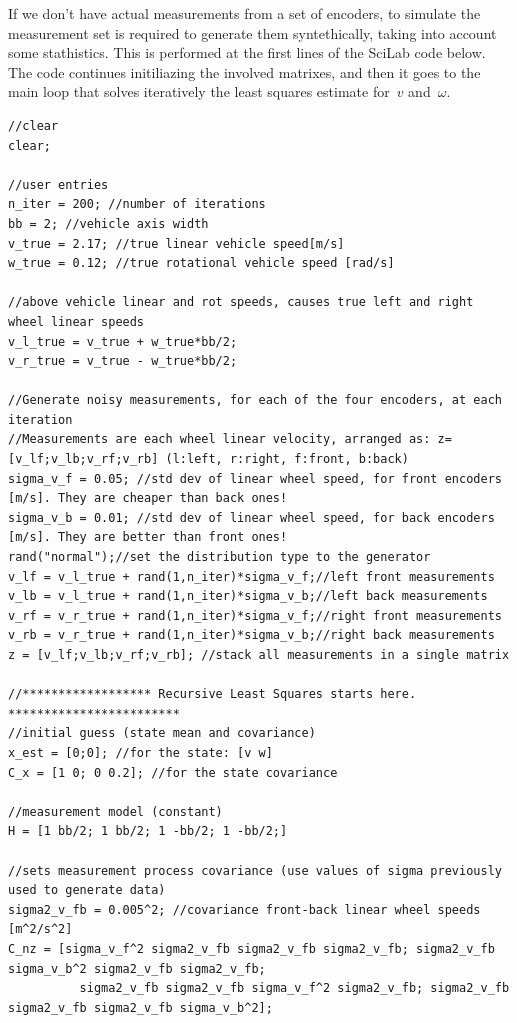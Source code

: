If we don't have actual measurements from a set of encoders, to simulate the measurement set is required to generate them syntethically, taking into account some stathistics. This is performed at the first lines of the SciLab code below.  The code continues initiliazing the involved matrixes, and then it goes to the main loop that solves iteratively the least squares estimate for~$v$ and~$\omega$.
\begin{mdframed}
\tiny
\begin{verbatim} 
//clear
clear;

//user entries 
n_iter = 200; //number of iterations
bb = 2; //vehicle axis width
v_true = 2.17; //true linear vehicle speed[m/s]
w_true = 0.12; //true rotational vehicle speed [rad/s]

//above vehicle linear and rot speeds, causes true left and right wheel linear speeds
v_l_true = v_true + w_true*bb/2;
v_r_true = v_true - w_true*bb/2;

//Generate noisy measurements, for each of the four encoders, at each iteration
//Measurements are each wheel linear velocity, arranged as: z=[v_lf;v_lb;v_rf;v_rb] (l:left, r:right, f:front, b:back)
sigma_v_f = 0.05; //std dev of linear wheel speed, for front encoders [m/s]. They are cheaper than back ones!
sigma_v_b = 0.01; //std dev of linear wheel speed, for back encoders [m/s]. They are better than front ones!
rand("normal");//set the distribution type to the generator
v_lf = v_l_true + rand(1,n_iter)*sigma_v_f;//left front measurements
v_lb = v_l_true + rand(1,n_iter)*sigma_v_b;//left back measurements
v_rf = v_r_true + rand(1,n_iter)*sigma_v_f;//right front measurements
v_rb = v_r_true + rand(1,n_iter)*sigma_v_b;//right back measurements
z = [v_lf;v_lb;v_rf;v_rb]; //stack all measurements in a single matrix

//****************** Recursive Least Squares starts here. ************************
//initial guess (state mean and covariance)
x_est = [0;0]; //for the state: [v w]
C_x = [1 0; 0 0.2]; //for the state covariance

//measurement model (constant)
H = [1 bb/2; 1 bb/2; 1 -bb/2; 1 -bb/2;]

//sets measurement process covariance (use values of sigma previously used to generate data)
sigma2_v_fb = 0.005^2; //covariance front-back linear wheel speeds [m^2/s^2]
C_nz = [sigma_v_f^2 sigma2_v_fb sigma2_v_fb sigma2_v_fb; sigma2_v_fb sigma_v_b^2 sigma2_v_fb sigma2_v_fb;
          sigma2_v_fb sigma2_v_fb sigma_v_f^2 sigma2_v_fb; sigma2_v_fb sigma2_v_fb sigma2_v_fb sigma_v_b^2];
          

\end{verbatim}
\end{mdframed}
